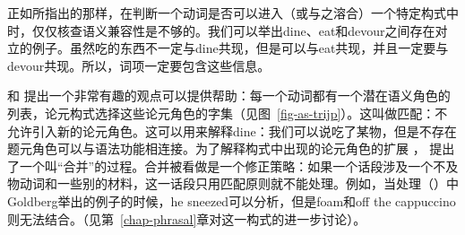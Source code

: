正如\citet[--90]{Dowty89b-u}所指出的那样，在判断一个动词是否可以进入（或与之溶合）一个特定构式中时，仅仅核查语义兼容性是不够的。我们可以举出dine、eat和devour之间存在对立的例子。虽然吃的东西不一定与dine共现，但是可以与eat共现，并且一定要与devour共现。所以，词项一定要包含这些信息。

和\citet{SvT2011a} 提出一个非常有趣的观点可以提供帮助：每一个动词都有一个潜在语义角色的列表，论元构式选择这些论元角色的字集（见图~\ref{fig-as-trijp}）。这叫做匹配：不允许引入新的论元角色。这可以用来解释dine：我们可以说吃了某物，但是不存在题元角色可以与语法功能相连接。为了解释构式中出现的论元角色的扩展 \citep[\S~7]{Goldberg95a}，\citet{SvT2011a} 提出了一个叫“合并”的过程。合并被看做是一个修正策略：如果一个话段涉及一个不及物动词和一些别的材料，这一话段只用匹配原则就不能处理。例如，当处理（）中Goldberg举出的例子的时候，he sneezed可以分析，但是foam和off the cappuccino则无法结合。（见第~\ref{chap-phrasal}章对这一构式的进一步讨论）。
